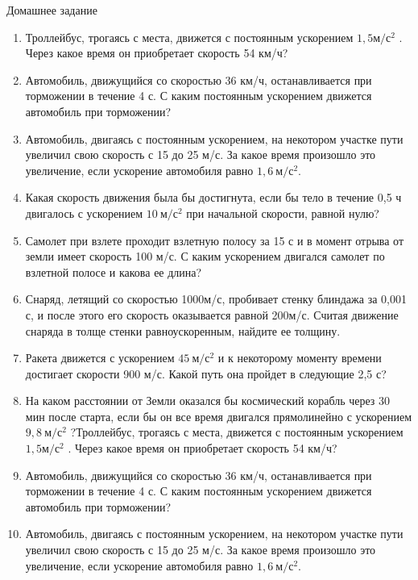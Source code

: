 \documentclass[a6paper, 11pt]{diss_4}
\renewcommand{\'}{\,'}
\begin{document}
\begin{center}
   Домашнее задание
\end{center}
\begin{enumerate}
\item Троллейбус,    трогаясь   с   места,    движется   с   постоянным   ускорением   $1,5   м/с^2$ . Через    какое   время    он    приобретает   скорость 54 км/ч?
\item Автомобиль,     движущийся     со     скоростью   36   км/ч,   останавливается   при   торможении   в   течение   4 с.   С   каким   постоянным  ускорением  движется  автомобиль   при торможении?
\item Автомобиль,   двигаясь   с   постоянным ускорением, на некотором участке пути увеличил свою скорость с 15 до 25 м/с. За какое время произошло это увеличение, если ускорение автомобиля равно $1,6\ м/с^2$.
\item Какая   скорость    движения   была   бы достигнута,   если   бы   тело   в   течение   0,5  ч двигалось с ускорением $10\ м/с^2$ при начальной скорости, равной нулю?
\item Самолет  при   взлете   проходит   взлетную  полосу  за 15 с и  в  момент отрыва от земли   имеет   скорость    100   м/с. С каким ускорением   двигался   самолет   по   взлетной полосе и какова ее длина?
\item Снаряд, летящий со скоростью 1000м/с, пробивает   стенку   блиндажа   за 0,001   с,  и  после этого его скорость  оказывается   равной 200м/с.   Считая    движение снаряда   в   толще   стенки   равноускоренным, найдите ее толщину.
\item Ракета движется с ускорением $45\ м/с^2$ и к некоторому моменту времени достигает скорости  900  м/с.  Какой   путь  она  пройдет в следующие 2,5 с?
\item На   каком   расстоянии от Земли оказался бы космический корабль через 30 мин после старта, если бы   он   все время двигался  прямолинейно с ускорением $9,8\ м/с^2$ ?Троллейбус,    трогаясь   с   места,    движется   с   постоянным   ускорением   $1,5   м/с^2$ . Через    какое   время    он    приобретает   скорость 54 км/ч?
\item Автомобиль,     движущийся     со     скоростью   36   км/ч,   останавливается   при   торможении   в   течение   4 с.   С   каким   постоянным  ускорением  движется  автомобиль   при торможении?
\item Автомобиль,   двигаясь   с   постоянным ускорением, на некотором участке пути увеличил свою скорость с 15 до 25 м/с. За какое время произошло это увеличение, если ускорение автомобиля равно $1,6\ м/с^2$.

\end{enumerate}
\end{document}
